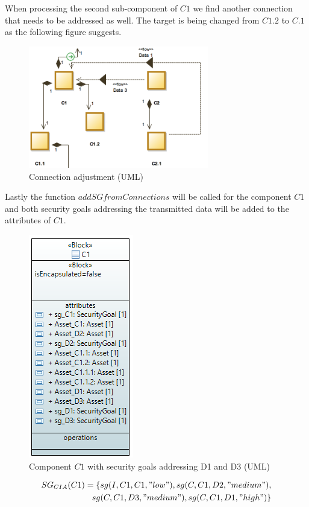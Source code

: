 When processing the second sub-component of $C1$ we find another connection that needs to be addressed as well. The target is being changed from $C1.2$ to $C.1$ as the following figure suggests.

\begin{figure}[H]
\centering
\includegraphics[width=0.7\textwidth]{pictures/con_c12}
\caption{Connection adjustment (UML)}
\label{fig:con_c1.2}
\end{figure} 

Lastly the function $addSGfromConnections$ will be called for the component $C1$ and both security goals addressing the transmitted data will be added to the attributes of $C1$.

\begin{figure}[H]
\centering
        \includegraphics[scale=0.9]{pictures/block_c1_final}
    \caption{Component $C1$ with security goals addressing D1 and D3 (UML)}
\end{figure}

\begin{align*}
SG_{CIA}(C1) = \{sg(I,C1,C1,"low"), sg(C,C1,D2, "medium"), \\ sg(C,C1,D3,"medium"), sg(C,C1,D1,"high")\}
\end{align*} 

